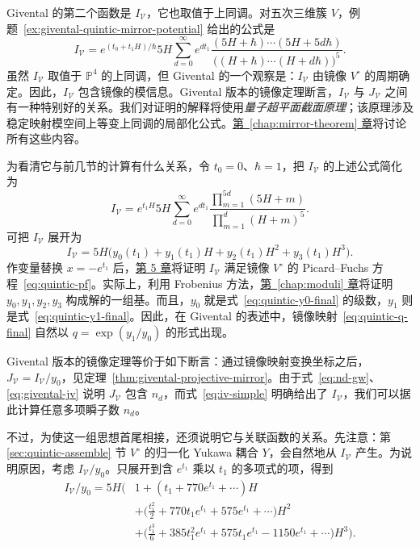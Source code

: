 Givental 的第二个函数是 $I_{\mathcal V}$，它也取值于上同调。对五次三维簇 $V$，例题~\ref{ex:givental-quintic-mirror-potential} 给出的公式是
\[
I_{\mathcal V}=e^{(t_0+t_1H)/\hbar}5H
\sum_{d=0}^{\infty}e^{dt_1}
\frac{(5H+\hbar)\cdots(5H+5d\hbar)}{
\bigl((H+\hbar)\cdots(H+d\hbar)\bigr)^5}.
\]
虽然 $I_{\mathcal V}$ 取值于 $\mathbb P^4$ 的上同调，但 Givental 的一个观察是：$I_{\mathcal V}$ 由镜像 $V^\circ$ 的周期确定。因此，$I_{\mathcal V}$ 包含镜像的模信息。Givental 版本的镜像定理断言，$I_{\mathcal V}$ 与 $J_{\mathcal V}$ 之间有一种特别好的关系。我们对证明的解释将使用\emph{量子超平面截面原理}；该原理涉及稳定映射模空间上等变上同调的局部化公式。\hyperref[chap:mirror-theorem]{第~\ref*{chap:mirror-theorem} 章}将讨论所有这些内容。

为看清它与前几节的计算有什么关系，令 $t_0=0$、$\hbar=1$，把 $I_{\mathcal V}$ 的上述公式简化为
\begin{equation}\label{eq:iv-simple}
I_{\mathcal V}=e^{t_1H}5H\sum_{d=0}^{\infty}e^{dt_1}
\frac{\prod_{m=1}^{5d}(5H+m)}{\prod_{m=1}^{d}(H+m)^5}.
\end{equation}
可把 $I_{\mathcal V}$ 展开为
\begin{equation}\label{eq:iv-period-expansion}
I_{\mathcal V}=5H\bigl(y_0(t_1)+y_1(t_1)H+y_2(t_1)H^2+y_3(t_1)H^3\bigr).
\end{equation}
作变量替换 $x=-e^{t_1}$ 后，\hyperref[chap:hodge-yukawa]{第 5 章}将证明 $I_{\mathcal V}$ 满足镜像 $V^\circ$ 的 Picard--Fuchs 方程~\eqref{eq:quintic-pf}。实际上，利用 Frobenius 方法，\hyperref[chap:moduli]{第~\ref*{chap:moduli} 章}将证明 $y_0,y_1,y_2,y_3$ 构成解的一组基。而且，$y_0$ 就是式~\eqref{eq:quintic-y0-final} 的级数，$y_1$ 则是式~\eqref{eq:quintic-y1-final}。因此，在 Givental 的表述中，镜像映射~\eqref{eq:quintic-q-final} 自然以 $q=\exp(y_1/y_0)$ 的形式出现。

Givental 版本的镜像定理等价于如下断言：通过镜像映射变换坐标之后，$J_{\mathcal V}=I_{\mathcal V}/y_0$，见定理~\ref{thm:givental-projective-mirror}。由于式~\eqref{eq:nd-gw}、\eqref{eq:givental-jv} 说明 $J_{\mathcal V}$ 包含 $n_d$，而式~\eqref{eq:iv-simple} 明确给出了 $I_{\mathcal V}$，我们可以据此计算任意多项瞬子数 $n_d$。

不过，为使这一组思想首尾相接，还须说明它与关联函数的关系。先注意：第 \ref{sec:quintic-assemble} 节 $V^\circ$ 的归一化 Yukawa 耦合 $Y$，会自然地从 $I_{\mathcal V}$ 产生。为说明原因，考虑 $I_{\mathcal V}/y_0$。只展开到含 $e^{t_1}$ 乘以 $t_1$ 的多项式的项，得到
\[
\begin{aligned}
I_{\mathcal V}/y_0=5H\Big(&1+(t_1+770e^{t_1}+\cdots)H\\
&+\bigl(\tfrac{t_1^2}{2}+770t_1e^{t_1}+575e^{t_1}+\cdots\bigr)H^2\\
&+\bigl(\tfrac{t_1^3}{6}+385t_1^2e^{t_1}+575t_1e^{t_1}-1150e^{t_1}+\cdots\bigr)H^3\Big).
\end{aligned}
\]

